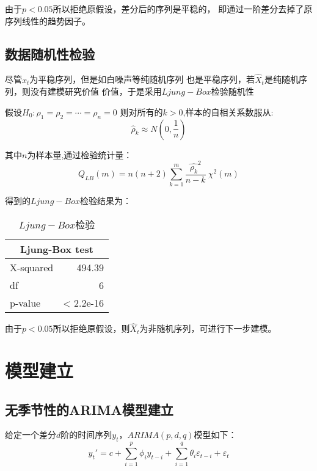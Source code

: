 \documentclass[12pt,a4paper]{nmmcm}
\begin{document}
由于\(p<0.05\)所以拒绝原假设，差分后的序列是平稳的，
即通过一阶差分去掉了原序列线性的趋势因子。

\subsection{数据随机性检验}
尽管\(\hat{x}_t\)为平稳序列，但是如白噪声等纯随机序列
也是平稳序列，若\(\hat{X}_t\)是纯随机序列，则没有建模研究价值
价值，于是采用\(Ljung-Box\)检验随机性

假设\(H_0:\rho _1 = \rho _2 = \cdots = \rho _n = 0\)
则对所有的\(k>0\),样本的自相关系数服从:
\begin{equation}
  \hat{\rho}_k \approx N(0,\frac{1}{n})
\end{equation}

其中\(n\)为样本量,通过检验统计量：
\begin{equation}
  Q_{LB}(m) = n (n+2)\sum_{k=1}^{m}{\frac{\hat{\rho_{k}}^2}{n-k}} ~\chi^2(m)
\end{equation}

得到的\(Ljung-Box\)检验结果为：
\begin{table}[H]
  \centering
  \caption{\(Ljung-Box\)检验}
    \begin{tabular}{ll}
    \multicolumn{2}{c}{Ljung-Box test} \\
    \hline
    X-squared  & \multicolumn{1}{r}{494.39} \\
    df    & \multicolumn{1}{r}{6} \\
    p-value & < 2.2e-16 \\
    \end{tabular}%
  \label{tab:Ljung-Box}%
\end{table}%

由于\(p<0.05\)所以拒绝原假设，则\(\hat{X}_t\)为非随机序列，可进行下一步建模。



\section{模型建立}
\subsection{无季节性的ARIMA模型建立}
给定一个差分\(d\)阶的时间序列\(y_t\)，\(ARIMA(p,d,q)\)模型如下：
\begin{equation}
  y_t'=c+\sum_{i=1}^p{\phi_i y_{t-i}}+\sum_{i=1}^q{\theta_i\varepsilon_{t-i}}+\varepsilon_t
\end{equation}
\end{document}
